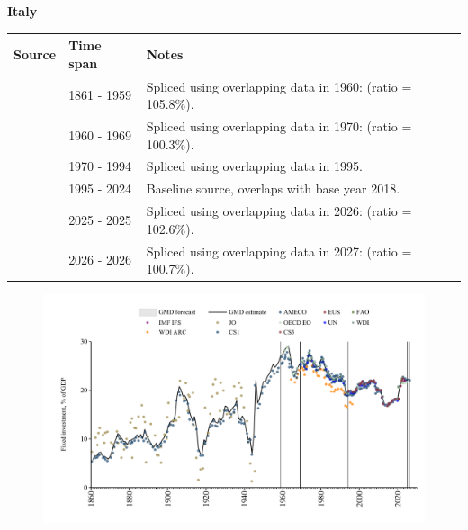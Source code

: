 \documentclass[12pt,a4paper,landscape]{article}
\begin{document}
\begin{adjustbox}{max totalsize={\paperwidth}{\paperheight},center}
\begin{minipage}[t][\textheight][t]{\textwidth}
\vspace*{0.5cm}
{}
\begin{center}
{\Large\bfseries Italy}
\end{center}
\vspace{0.5cm}
\begin{table}[H]
\centering
\small
\begin{tabular}{|l|l|l|}
\hline
\textbf{Source} & \textbf{Time span} & \textbf{Notes} \\
\hline
\rowcolor{white}\cite{CS1_ITA}& 1861 - 1959 &Spliced using overlapping data in 1960: (ratio = 105.8\%).\\
\rowcolor{lightgray}\cite{OECD_EO}& 1960 - 1969 &Spliced using overlapping data in 1970: (ratio = 100.3\%).\\
\rowcolor{white}\cite{WDI}& 1970 - 1994 &Spliced using overlapping data in 1995.\\
\rowcolor{lightgray}\cite{EUS}& 1995 - 2024 &Baseline source, overlaps with base year 2018.\\
\rowcolor{white}\cite{OECD_EO}& 2025 - 2025 &Spliced using overlapping data in 2026: (ratio = 102.6\%).\\
\rowcolor{lightgray}\cite{AMECO}& 2026 - 2026 &Spliced using overlapping data in 2027: (ratio = 100.7\%).\\
\hline
\end{tabular}
\end{table}
\begin{figure}[H]
\centering
\includegraphics[width=\textwidth,height=0.6\textheight,keepaspectratio]{graphs/ITA_finv_GDP.pdf}
\end{figure}
\end{minipage}
\end{adjustbox}
\end{document}
